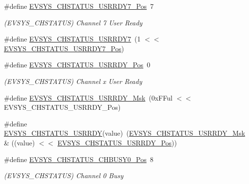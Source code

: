 \begin{DoxyCompactItemize}
\item 
\#define \mbox{\hyperlink{group___s_a_m_d21___e_v_s_y_s_ga412f83381c36ad847c1a8d10ccd0f363}{E\+V\+S\+Y\+S\+\_\+\+C\+H\+S\+T\+A\+T\+U\+S\+\_\+\+U\+S\+R\+R\+D\+Y7\+\_\+\+Pos}}~7
\begin{DoxyCompactList}\small\item\em (E\+V\+S\+Y\+S\+\_\+\+C\+H\+S\+T\+A\+T\+US) Channel 7 User Ready \end{DoxyCompactList}\item 
\#define \mbox{\hyperlink{group___s_a_m_d21___e_v_s_y_s_ga70feaef283d4de5dbfdfaed36c47892c}{E\+V\+S\+Y\+S\+\_\+\+C\+H\+S\+T\+A\+T\+U\+S\+\_\+\+U\+S\+R\+R\+D\+Y7}}~(1 $<$$<$ \mbox{\hyperlink{group___s_a_m_d21___e_v_s_y_s_ga412f83381c36ad847c1a8d10ccd0f363}{E\+V\+S\+Y\+S\+\_\+\+C\+H\+S\+T\+A\+T\+U\+S\+\_\+\+U\+S\+R\+R\+D\+Y7\+\_\+\+Pos}})
\item 
\#define \mbox{\hyperlink{group___s_a_m_d21___e_v_s_y_s_ga94f145b3b3e74ba31c684f04202e6777}{E\+V\+S\+Y\+S\+\_\+\+C\+H\+S\+T\+A\+T\+U\+S\+\_\+\+U\+S\+R\+R\+D\+Y\+\_\+\+Pos}}~0
\begin{DoxyCompactList}\small\item\em (E\+V\+S\+Y\+S\+\_\+\+C\+H\+S\+T\+A\+T\+US) Channel x User Ready \end{DoxyCompactList}\item 
\#define \mbox{\hyperlink{group___s_a_m_d21___e_v_s_y_s_ga16a09e90156c8447d3ed7f59699eb3c3}{E\+V\+S\+Y\+S\+\_\+\+C\+H\+S\+T\+A\+T\+U\+S\+\_\+\+U\+S\+R\+R\+D\+Y\+\_\+\+Msk}}~(0x\+F\+Ful $<$$<$ E\+V\+S\+Y\+S\+\_\+\+C\+H\+S\+T\+A\+T\+U\+S\+\_\+\+U\+S\+R\+R\+D\+Y\+\_\+\+Pos)
\item 
\#define \mbox{\hyperlink{group___s_a_m_d21___e_v_s_y_s_ga295c34f5c69a2b004da0dd64c3e47168}{E\+V\+S\+Y\+S\+\_\+\+C\+H\+S\+T\+A\+T\+U\+S\+\_\+\+U\+S\+R\+R\+DY}}(value)~(\mbox{\hyperlink{group___s_a_m_d21___e_v_s_y_s_ga16a09e90156c8447d3ed7f59699eb3c3}{E\+V\+S\+Y\+S\+\_\+\+C\+H\+S\+T\+A\+T\+U\+S\+\_\+\+U\+S\+R\+R\+D\+Y\+\_\+\+Msk}} \& ((value) $<$$<$ \mbox{\hyperlink{group___s_a_m_d21___e_v_s_y_s_ga94f145b3b3e74ba31c684f04202e6777}{E\+V\+S\+Y\+S\+\_\+\+C\+H\+S\+T\+A\+T\+U\+S\+\_\+\+U\+S\+R\+R\+D\+Y\+\_\+\+Pos}}))
\item 
\#define \mbox{\hyperlink{group___s_a_m_d21___e_v_s_y_s_ga9a10f270ab54c11a0b74eddf263dd36b}{E\+V\+S\+Y\+S\+\_\+\+C\+H\+S\+T\+A\+T\+U\+S\+\_\+\+C\+H\+B\+U\+S\+Y0\+\_\+\+Pos}}~8
\begin{DoxyCompactList}\small\item\em (E\+V\+S\+Y\+S\+\_\+\+C\+H\+S\+T\+A\+T\+US) Channel 0 Busy \end{DoxyCompactList}\item 
$$
\end{DoxyCompactItemize}
